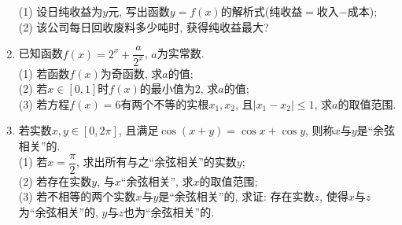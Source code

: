 \documentclass[10pt,a4paper]{article}
\begin{document}
\begin{enumerate}[1.]
(1) 设日纯收益为$y$元, 写出函数$y=f(x)$的解析式(纯收益$=$收入$-$成本);\\
(2) 该公司每日回收废料多少吨时, 获得纯收益最大?
\item 已知函数$f(x)=2^x+\dfrac a{2^x}$, $a$为实常数.\\
(1) 若函数$f(x)$为奇函数, 求$a$的值;\\
(2) 若$x\in [0,1]$时$f(x)$的最小值为$2$, 求$a$的值;\\
(3) 若方程$f(x)=6$有两个不等的实根$x_1,x_2$, 且$|x_1-x_2|\le 1$, 求$a$的取值范围.
\item 若实数$x,y\in [0,2\pi]$, 且满足$\cos (x+y)=\cos x+\cos y$, 则称$x$与$y$是``余弦相关''的.\\
(1) 若$x=\dfrac{\pi}2$, 求出所有与之``余弦相关''的实数$y$;\\
(2) 若存在实数$y$, 与$x$``余弦相关'', 求$x$的取值范围;\\
(3) 若不相等的两个实数$x$与$y$是``余弦相关''的, 求证: 存在实数$z$, 使得$x$与$z$ 为``余弦相关''的, $y$与$z$也为``余弦相关''的.



\end{enumerate}
\end{document}
